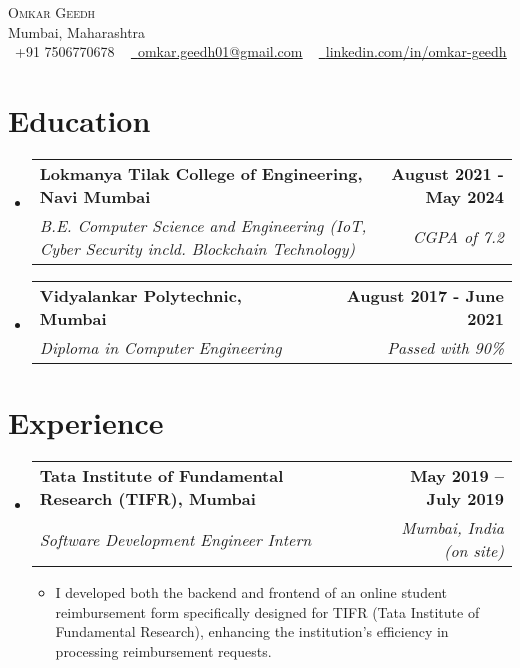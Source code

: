 \documentclass[letterpaper,11pt]{article}
\makeatletter
\newcommand{\resumeItem}[1]{
  \item\small{
	{#1 \vspace{-2pt}}
  }
}
\newcommand{\resumeSubheading}[4]{
  \vspace{-2pt}\item
	\begin{tabular*}{1.0\textwidth}[t]{l@{\extracolsep{\fill}}r}
  	\textbf{#1} & \textbf{\small #2} \\
  	\textit{\small#3} & \textit{\small #4} \\
	\end{tabular*}\vspace{-7pt}
}
\newcommand{\resumeSubHeadingListStart}{\begin{itemize}[leftmargin=0.0in, label={}]}
\newcommand{\resumeSubHeadingListEnd}{\end{itemize}}
\newcommand{\resumeItemListStart}{\begin{itemize}}
\newcommand{\resumeItemListEnd}{\end{itemize}\vspace{-5pt}}
\makeatother
\begin{document}
\begin{center}
	{\Huge \scshape Omkar Geedh} \\ \vspace{1pt}
	Mumbai, Maharashtra \\ \vspace{1pt}
	\small \raisebox{-0.1\height}\faPhone\ +91 7506770678 ~ \href{mailto:omkar.geedh01@gmail.com}{\raisebox{-0.2\height}\faEnvelope\  \underline{omkar.geedh01@gmail.com}} ~
	\href{https://www.linkedin.com/in/omkar-geedh/}{\raisebox{-0.2\height}\faLinkedin\ \underline{linkedin.com/in/omkar-geedh}}
	\vspace{-8pt}
\end{center}


\section{Education}
  \resumeSubHeadingListStart
	\resumeSubheading
  	{Lokmanya Tilak College of Engineering, Navi Mumbai}{August 2021 - May 2024}
  	{B.E. Computer Science and Engineering (IoT, Cyber Security incld. Blockchain Technology)}{CGPA of 7.2}
   \resumeSubheading
  	{Vidyalankar Polytechnic, Mumbai}{August 2017 - June 2021}
  	{Diploma in Computer Engineering}{Passed with 90\%}

   
  \resumeSubHeadingListEnd


\section{Experience}
  \resumeSubHeadingListStart
	\resumeSubheading
  	{Tata Institute of Fundamental Research (TIFR), Mumbai }{May 2019 -- July 2019}
  	{Software Development Engineer Intern}{Mumbai, India (on site)}
  	\resumeItemListStart
    	\resumeItem{I developed both the backend and frontend of an online student reimbursement form specifically designed for TIFR (Tata Institute of Fundamental Research), enhancing the institution's efficiency in processing reimbursement requests.}
    	
	\resumeItemListEnd
    
  \resumeSubHeadingListEnd
\vspace{-16pt}

\end{document}
